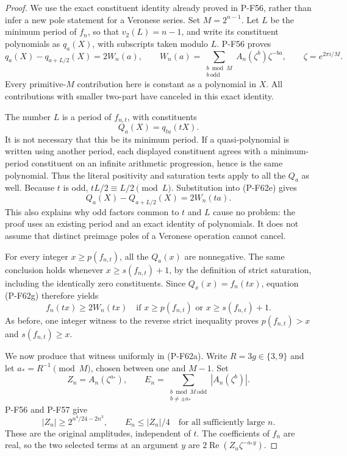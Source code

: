\begin{proof}
We use the exact constituent identity already proved in
P-F56, rather than infer a new pole statement for a Veronese
series. Set $M=2^{n-1}$. Let $L$ be the minimum period of
$f_n$, so that $v_2(L)=n-1$, and write its constituent
polynomials as $q_a(X)$, with subscripts taken modulo $L$.
P-F56 proves
\[
 q_a(X)-q_{a+L/2}(X)=2W_n(a),\qquad
 W_n(a)=\sum_{\substack{b\bmod M\\b\ \mathrm{odd}}}
                   A_n(\zeta^b)\zeta^{-ba},
 \qquad \zeta=e^{2\pi i/M}.
                                                               \tag{P-F62e}
\]
Every primitive-$M$ contribution here is constant as a
polynomial in $X$. All contributions with smaller two-part
have canceled in this exact identity.

The number $L$ is a period of $f_{n,t}$, with constituents
\[
                         Q_a(X)=q_{ta}(tX).
                                                               \tag{P-F62f}
\]
It is not necessary that this be its minimum period.
If a quasi-polynomial is written using another period,
each displayed constituent agrees with a minimum-period
constituent on an infinite arithmetic progression, hence
is the same polynomial. Thus the literal positivity and
saturation tests apply to all the $Q_a$ as well.
Because $t$ is odd,
$tL/2\equiv L/2\pmod L$. Substitution into (P-F62e) gives
\[
                 Q_a(X)-Q_{a+L/2}(X)=2W_n(ta).
                                                               \tag{P-F62g}
\]
This also explains why odd factors common to $t$ and $L$
cause no problem: the proof uses an existing period and
an exact identity of polynomials. It does not assume
that distinct preimage poles of a Veronese operation
cannot cancel.

For every integer $x\ge p(f_{n,t})$, all the $Q_a(x)$ are
nonnegative. The same conclusion holds whenever
$x\ge s(f_{n,t})+1$, by the definition of strict saturation,
including the identically zero constituents. Since
$Q_x(x)=f_n(tx)$, equation (P-F62g) therefore yields
\[
 f_n(tx)\ge2W_n(tx)
 \quad\text{if }x\ge p(f_{n,t})
                  \text{ or }x\ge s(f_{n,t})+1.
                                                               \tag{P-F62h}
\]
As before, one integer witness to the reverse strict
inequality proves $p(f_{n,t})>x$ and $s(f_{n,t})\ge x$.

We now produce that witness uniformly in (P-F62a).
Write $R=3g\in\{3,9\}$ and let $a_*=R^{-1}\pmod M$,
chosen between one and $M-1$. Set
\[
 Z_n=A_n(\zeta^{a_*}),\qquad
 E_n=\sum_{\substack{b\bmod M\ \mathrm{odd}\\
                              b\ne\pm a_*}}
                       |A_n(\zeta^b)|.
\]
P-F56 and P-F57 give
\[
       |Z_n|\ge2^{n^4/24-2n^3},\qquad
                 E_n\le|Z_n|/4
                      \quad\text{for all sufficiently large }n.
                                                               \tag{P-F62i}
\]
These are the original amplitudes, independent of $t$.
The coefficients of $f_n$ are real, so the two selected
terms at an argument $y$ are
$2\operatorname{Re}(Z_n\zeta^{-a_*y})$.


\end{proof}
